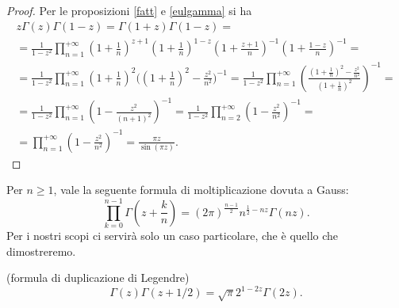 \begin{proof}
  Per le proposizioni \ref{fatt} e \ref{eulgamma} si ha
  \begin{gather*}
    z\Gamma(z)\Gamma(1-z)=\Gamma(1+z)\Gamma(1-z)=\\
    =\frac{1}{1-z^2}\prod_{n=1}^{+\infty} \left(1+\frac{1}{n}\right)^{z+1}\left(1+\frac{1}{n}\right)^{1-z}\left(1+\frac{z+1}{n}\right)^{-1}\left(1+\frac{1-z}{n}\right)^{-1}=\\
    =\frac{1}{1-z^2}\prod_{n=1}^{+\infty}\left(1+\frac{1}{n}\right)^2\Bigg(\left(1+\frac{1}{n}\right)^2-\frac{z^2}{n^2}\Bigg)^{-1}=\frac{1}{1-z^2}\prod_{n=1}^{+\infty} \left(\frac{\left(1+\frac{1}{n}\right)^2-\frac{z^2}{n^2}}{\left(1+\frac{1}{n}\right)^2}\right)^{-1}=\\
    =\frac{1}{1-z^2}\prod_{n=1}^{+\infty} \left(1-\frac{z^2}{(n+1)^2}\right)^{-1}=\frac{1}{1-z^2}\prod_{n=2}^{+\infty}\left(1-\frac{z^2}{n^2}\right)^{-1}=\\
    =\prod_{n=1}^{+\infty}\left(1-\frac{z^2}{n^2}\right)^{-1}=\frac{\pi z}{\sin(\pi z)}.
  \end{gather*}
\end{proof}

Per $n \ge 1$, vale la seguente formula di moltiplicazione dovuta a Gauss:
$$\prod_{k=0}^{n-1}\Gamma\left(z+\frac{k}{n}\right)=(2\pi)^{\frac{n-1}{2}}n^{\frac{1}{2}-nz}\Gamma(nz).$$
Per i nostri scopi ci servirà solo un caso particolare, che è quello che dimostreremo.

\begin{prop}
  (formula di duplicazione di Legendre)
  \begin{equation}
    \Gamma(z)\Gamma(z+1/2)=\sqrt{\pi}2^{1-2z}\Gamma(2z).
  \end{equation}
\end{prop}

